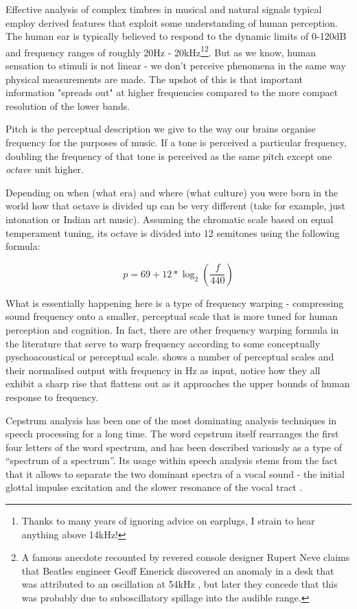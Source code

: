 {{Effective analysis of complex timbres in musical and natural signals typical employ derived features that exploit some understanding of human perception. The human ear is typically believed to respond to the dynamic limits of 0-120dB and frequency ranges of roughly 20Hz - 20kHz\footnote{Thanks to many years of ignoring advice on earplugs, I strain to hear anything above 14kHz!}\footnote{A famous anecdote recounted by revered console designer Rupert Neve claims that Beatles engineer Geoff Emerick discovered an anomaly in a desk that was attributed to an oscillation at 54kHz \citep{Winer2012}, but later they concede that this was probably due to suboscillatory spillage into the audible range.}. But as we know, human sensation to stimuli is not linear - we don't perceive phenomena in the same way physical measurements are made. The upshot of this is that important information "spreads out" at higher frequencies compared to the more compact resolution of the lower bands.

Pitch is the perceptual description we give to the way our brains organise frequency for the purposes of music. If a tone is perceived a particular frequency, doubling the frequency of that tone is perceived as the same pitch except one \textit{octave} unit higher.

Depending on when (what era) and where (what culture) you were born in the world how that octave is divided up can be very different (take for example, just intonation or Indian art music). Assuming the chromatic scale based on equal temperament tuning, its octave is divided into 12 semitones using the following formula:

\begin{equation}
\label{eq:High Frequency Content}	
p = 69 + 12 * \log_2(\frac{f}{440})
\end{equation}

What is essentially happening here is a type of frequency warping - compressing sound frequency onto a smaller, perceptual scale that is more tuned for human perception and cognition. In fact, there are other frequency warping formula in the literature that serve to warp frequency according to some conceptually pyschoacoustical or perceptual scale.  shows a number of perceptual scales and their normalised output with frequency in Hz as input, notice how they all exhibit a sharp rise that flattens out as it approaches the upper bounds of human response to frequency.

Cepstrum analysis has been one of the most dominating analysis techniques in speech processing for a long time. The word cepstrum itself rearranges the first four letters of the word spectrum, and has been described variously as a type of ``spectrum of a spectrum''. Its usage within speech analysis stems from the fact that it allows to separate the two dominant spectra of a vocal sound - the initial glottal impulse excitation and the slower resonance of the vocal tract \citep{Roads1996, Kim2006}.

}}
